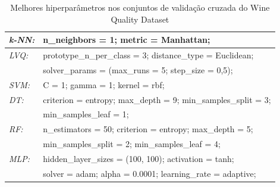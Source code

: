 \documentclass[journal]{IEEEtran}
\begin{document}
\begin{table}[h!]
	\caption{Melhores hiperparâmetros nos conjuntos de validação cruzada do Wine Quality Dataset}
	\label{tab:5}
	\begin{tabular}{ l l }
		\hline
		\textit{k-NN:} & n\_neighbors = 1; metric = Manhattan;                         \\
		\hline
		\textit{LVQ:}  & prototype\_n\_per\_class = 3; distance\_type = Euclidean;     \\  & solver\_params = (max\_runs = 5; step\_size = 0,5);\\
		\hline
		\textit{SVM:}  & C = 1; gamma = 1; kernel = rbf;                               \\
		\hline
		\textit{DT:}   & criterion = entropy; max\_depth = 9; min\_samples\_split = 3; \\  & min\_samples\_leaf = 1;\\
		\hline
		\textit{RF:}   & n\_estimators = 50; criterion = entropy; max\_depth = 5;      \\  & min\_samples\_split = 2; min\_samples\_leaf = 4;\\
		\hline
		\textit{MLP:}  & hidden\_layer\_sizes = (100, 100); activation = tanh;         \\  & solver = adam; alpha = 0.0001; learning\_rate = adaptive;\\
		\hline
	\end{tabular}
\end{table}
\end{document}
